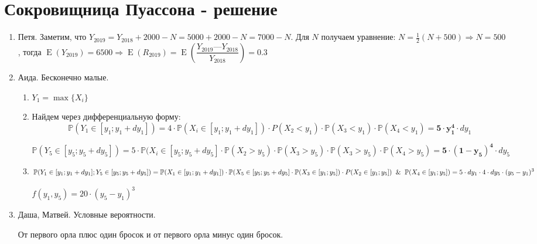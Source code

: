 \documentclass[a4paper,12pt]{article}
\DeclareMathOperator{\E}{E}
\def \P{\mathbb{P}}
\begin{document}
\newpage
\section{Сокровищница Пуассона - решение}

\begin{enumerate}
\item Петя.
Заметим, что $Y_{2019} = Y_{2018} + 2000 - N = 5000 + 2000 - N = 7000 - N$. Для $N$ получаем уравнение: $N = \frac{1}{2}(N + 500) \Rightarrow N = 500$, тогда $\E(Y_{2019}) = 6500 \Rightarrow \E(R_{2019}) = \E\left(\dfrac{Y_{2019} — Y_{2018}}{Y_{2018}}\right) = 0.3$
\item Аида. Бесконечно малые.
\begin{enumerate}
\item $Y_1=\max\{X_i\}$
\item Найдем через дифференциальную форму:
\[
\P(Y_1 \in [y_1;y_1+dy_1])=4\cdot \P (X_i \in [y_1;y_1+dy_1]) \cdot P(X_2<y_1) \cdot \P(X_3<y_1) \cdot \P(X_4<y_1) = \mathbf{5\cdot y_1^4} \cdot dy_1
\]

\[
\P(Y_5 \in [y_5;y_5+dy_5])= 5\cdot \P(X_i \in [y_5;y_5+dy_5] \cdot \P(X_2>y_5) \cdot \P(X_3>y_5) \cdot \P(X_3>y_5) \cdot \P(X_4>y_5)=\mathbf{5\cdot (1-y_5)^4} \cdot dy_5
\]

\item
\[
\P(Y_1 \in [y_1;y_1+dy_1];Y_5 \in [y_5;y_5+dy_5] )= \P(X_1 \in [y_1;y_1+dy_1])\cdot \P(X_5 \in [y_5;y_5+dy_5] \cdot \P(X_3 \in [y_1;y_5]) \cdot  P(X_2 \in [y_1;y_5])\And  \P(X_4 \in [y_1;y_5]) = 5 \cdot dy_1 \cdot 4 \cdot dy_5 \cdot (y_5-y_1)^3
\]

$f(y_1, y_5)= 20 \cdot (y_5-y_1)^3$
\end{enumerate}

\item Даша, Матвей. Условные вероятности.

От первого орла плюс один бросок и от первого орла минус один бросок.
\end{enumerate}
\end{document}
